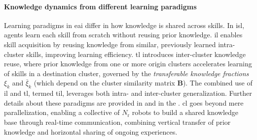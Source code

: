 \documentclass[12pt]{article}
\renewcommand{\emph}[1]{\textit{#1}}
\begin{document}
\paragraph*{Knowledge dynamics from different learning paradigms}
Learning paradigms in \ac{eai} differ in how knowledge is shared across skills. In \ac{isl}, agents learn each skill from scratch without reusing prior knowledge. \Ac{il} enables skill acquisition by reusing knowledge from similar, previously learned intra-cluster skills, improving learning efficiency. \Ac{tl} introduces inter-cluster knowledge reuse, where prior knowledge from one or more origin clusters accelerates learning of skills in a destination cluster, governed by the \emph{transferable knowledge fractions} $\xi_k$ and $\bar{\xi}_k$ (which depend on the cluster similarity matrix $\bm{B}$). The combined use of \ac{il} and \ac{tl}, termed \ac{til}, leverages both intra- and inter-cluster generalization. Further details about these paradigms are provided in  and in the . \Ac{cl} goes beyond mere parallelization, enabling a collective of $N_\mathrm{r}$ robots to build a shared knowledge base through real-time communication, combining vertical transfer of prior knowledge and horizontal sharing of ongoing experiences.

\end{document}
